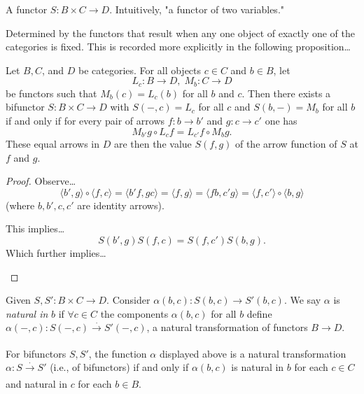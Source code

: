 A functor $S : B \times C \rightarrow D$. Intuitively, "a functor of two variables."\newline

\noindent Determined by the functors that result when any one object of exactly one of the categories is fixed. This is
recorded more explicitly in the following proposition\dots

\begin{proposition}
Let $B,C$, and $D$ be categories. For all objects $c \in C$ and $b \in B$, let
$$L_c : B \rightarrow D, \; M_b : C \rightarrow D$$
be functors such that $M_b(c) = L_c(b)$ for all $b$ and $c$. Then there exists a bifunctor $S: B \times C \rightarrow D$
with $S(-, c) = L_c$ for all $c$ and $S(b,-) = M_b$ for all $b$ if and only if for every pair of arrows $f:b \rightarrow b'$
and $g:c \rightarrow c'$ one has
$$M_{b'}g \circ L_cf = L_{c'}f \circ M_bg.$$
These equal arrows in $D$ are then the value $S(f,g)$ of the arrow function of $S$ at $f$ and $g$.
\end{proposition}

\begin{proof}
Observe\dots
$$\langle b',g \rangle \circ \langle f,c \rangle  = \langle b'f,gc \rangle = \langle f,g \rangle =  \langle fb,c'g \rangle = \langle f,c' \rangle \circ \langle b,g \rangle$$
(where $b,b',c,c'$ are identity arrows).\newline

\noindent This implies\dots
$$S(b',g)S(f,c)=S(f,c')S(b,g).$$
Which further implies\dots

\begin{figure}[H]
\centering

\end{figure}

\end{proof}

Given $S,S':B \times C \rightarrow D$. Consider $\alpha(b,c) : S(b,c) \rightarrow S'(b,c)$. We say $\alpha$ is \emph{natural in}\label{naturalin} $b$ if $\forall c \in C$ the components $\alpha(b,c)$
for all $b$ define $\alpha(-,c): S(-,c) \xrightarrow[]{\cdot} S'(-,c)$, a natural transformation of functors $B \rightarrow D$.

\begin{proposition}
For bifunctors $S,S'$, the function $\alpha$ displayed above is a natural transformation $\alpha:S \xrightarrow[]{\cdot} S'$ (i.e., of bifunctors) if and only if $\alpha(b,c)$ is natural
in $b$ for each $c \in C$ and natural in $c$ for each $b \in B$.

\begin{figure}[H]
\centering

\end{figure}

\end{proposition}

